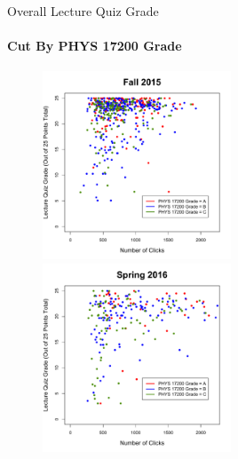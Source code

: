 \documentclass[xcolor=x11names,compress]{beamer}
\begin{document}
\begin{frame}{Overall Lecture Quiz Grade}
	\framesubtitle{Cut By PHYS 17200 Grade}
	\begin{figure}
		\includegraphics[width=0.5\textwidth]{img/lecture_fa15_172.pdf}
		\includegraphics[width=0.5\textwidth]{img/lecture_sp16_172.pdf}
	\end{figure}
\end{frame}
\end{document}
